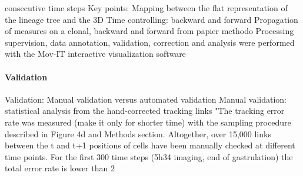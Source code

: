 consecutive time steps    Key points:   Mapping between the flat representation of the lineage tree and the 3D   Time controlling: backward and forward  Propagation of measures on a clonal, backward and forward   from papier methodo   Processing supervision, data annotation, validation, correction and analysis were performed with the Mov-IT interactive visualization software     

\paragraph{Validation}     Validation:   Manual validation versus automated validation    Manual validation: statistical analysis from the hand-corrected tracking links     "The tracking error rate was measured (make it only for shorter time) with the sampling procedure described in Figure 4d and Methods section. Altogether, over 15,000 links between the t and t+1 positions of cells have been manually checked at different time points. For the first 300 time steps (5h34 imaging, end of gastrulation) the total error rate is lower than 2%